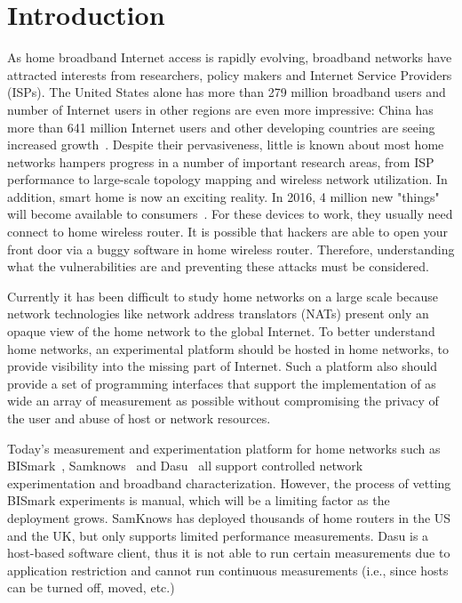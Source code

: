 \chapter{Introduction}
\label{sec.introduction}
As home broadband Internet access is rapidly evolving, broadband networks 
have attracted interests from researchers, policy makers and Internet 
Service Providers (ISPs). The United States alone has more than 279 million 
broadband users and number of Internet users in other regions are even more 
impressive: China has more than 641 million Internet users and other 
developing countries are seeing increased growth~\cite{asia}. Despite their 
pervasiveness, little is known about most home networks hampers progress in 
a number of important research areas, from ISP performance to large-scale 
topology mapping and wireless network utilization. In addition, smart home is now an exciting reality. In 2016, 4 million new "things" will become available to consumers~\cite{gartner}. For these devices to work, they usually need connect to home wireless router. It is possible that hackers are able to open your front door via a buggy software in home wireless router. Therefore, understanding what the vulnerabilities are and preventing these attacks must be considered.

Currently it has been difficult to study home networks on a large scale because network technologies like network address translators (NATs) present only an opaque view of the home network to the global Internet. To better understand home networks, an experimental platform should be hosted in home networks, to provide visibility into the missing part of Internet. Such a platform also should provide a set of programming interfaces that support the implementation of as wide an array of measurement as possible without compromising the privacy of the user and abuse of host or network resources. 

Today's measurement and experimentation platform for home networks such as 
BISmark~\cite{183951}, Samknows~\cite{samknows} and Dasu~\cite{
sanchez2014measurement} all support controlled network experimentation 
and broadband characterization. However, the process of vetting BISmark 
experiments is manual, which will be a limiting factor as the deployment 
grows. SamKnows has deployed thousands of home routers in the US and the UK, 
but only supports limited performance measurements. Dasu is a host-based 
software client, thus it is not able to run certain measurements due to 
application restriction and cannot run continuous measurements (i.e., since 
hosts can be turned off, moved, etc.)
 
